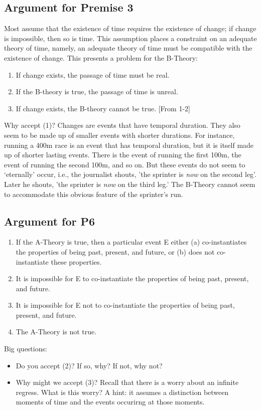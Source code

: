\documentclass[]{article}
\begin{document}
\subsection*{Argument for Premise 3}
Most assume that the existence of time requires the existence of change; if change is impossible, then so is time. This assumption places a constraint on an adequate theory of time, namely, an adequate theory of time must be compatible with the existence of change. This presents a problem for the B-Theory: 
\begin{enumerate}
\item If change exists, the passage of time must be real.
\item If the B-theory is true, the passage of time is unreal.
\item If change exists, the B-theory cannot be true. [From 1-2]
\end{enumerate} 

Why accept (1)?  Changes are events that have temporal duration. They also seem to be made up of smaller events with shorter durations. For instance, running a 400m race is an event that has temporal duration, but it is itself made up of shorter lasting events. There is the event of running the first 100m, the event of running the second 100m, and so on. But these events do not seem to `eternally' occur, i.e., the journalist shouts, 'the sprinter is \emph{now} on the second leg'. Later he shouts, 'the sprinter is \emph{now} on the third leg.'  The B-Theory cannot seem to accommodate this obvious feature of the sprinter's run. 
 

\subsection*{Argument for P6}

\begin{enumerate}
\item If the A-Theory is true, then a particular event E either (a) co-instantiates the properties of being past, present, and future, or (b) does not co-instantiate these properties. 
\item It is impossible for E to co-instantiate the properties of being past, present, and future.
\item It is impossible for E not to co-instantiate the properties of being past, present, and future. 
\item The A-Theory is not true. 
\end{enumerate}
Big questions:
\begin{itemize}
\item Do you accept (2)? If so, why? If not, why not? 
\item Why might we accept (3)? Recall that there is a worry about an infinite regress. What is this worry? A hint: it assumes a distinction between moments of time and the events occurirng at those moments.
\end{itemize}
\end{document}
